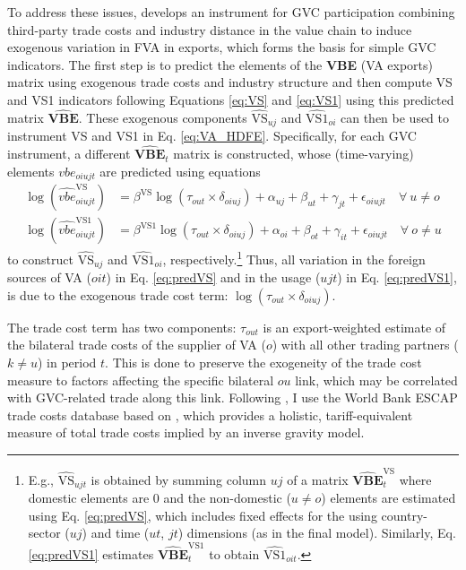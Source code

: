 \documentclass[a4paper]{article}
\begin{document}
To address these issues, \citet{Kummritz20161} develops an instrument for GVC participation combining third-party trade costs and industry distance in the value chain to induce exogenous variation in FVA in exports, which forms the basis for simple GVC indicators. The first step is to predict the elements of the \textbf{VBE} (VA exports) matrix using exogenous trade costs and industry structure and then compute VS and VS1 indicators following Equations \ref{eq:VS} and \ref{eq:VS1} using this predicted matrix $\hat{\textbf{VBE}}$. These exogenous components $\hat{\text{VS}}_{uj}$ and $\hat{\text{VS1}}_{oi}$ can then be used to instrument VS and VS1 in Eq. \ref{eq:VA_HDFE}. Specifically, for each GVC instrument, a different $\hat{\textbf{VBE}}_t$ matrix is constructed, whose (time-varying) elements $vbe_{oiujt}$ are predicted using equations
%
\begin{align} \label{eq:predVS}
\log(\hat{vbe}_{oiujt}^\text{VS}) &= \beta^\text{VS} \log(\tau_{out}\times \delta_{oiuj}) + \alpha_{uj} + \beta_{ut} +\gamma_{jt} + \epsilon_{oiujt} \quad \forall\  u\neq o \\ \label{eq:predVS1}
\log(\hat{vbe}_{oiujt}^\text{VS1}) &= \beta^\text{VS1} \log(\tau_{out}\times \delta_{oiuj}) + \alpha_{oi} + \beta_{ot} +\gamma_{it} + \epsilon_{oiujt} \quad \forall\  o\neq u
\end{align}
%
to construct $\hat{\text{VS}}_{uj}$ and $\hat{\text{VS1}}_{oi}$, respectively.\footnote{E.g., $\hat{\text{VS}}_{ujt}$ is obtained by summing column $uj$ of a matrix $\hat{\textbf{VBE}}_t^\text{VS}$ where domestic elements are 0 and the non-domestic ($u\neq o$) elements are estimated using Eq. \ref{eq:predVS}, which includes fixed effects for the using country-sector ($uj$) and time ($ut$, $jt$) dimensions (as in the final model). Similarly, Eq. \ref{eq:predVS1} estimates $\hat{\textbf{VBE}}_t^\text{VS1}$ to obtain $\hat{\text{VS1}}_{oit}$. \vspace{-5mm} } Thus, all variation in the foreign sources of VA ($oit$) in Eq. \ref{eq:predVS} and in the usage ($ujt$) in Eq. \ref{eq:predVS1}, is due to the exogenous trade cost term: $\log(\tau_{out}\times \delta_{oiuj})$. \newline

The trade cost term has two components: $\tau_{out}$ is an export-weighted estimate of the bilateral trade costs of the supplier of VA ($o$) with all other trading partners ($k\neq u$) in period $t$. This is done to preserve the exogeneity of the trade cost measure to factors affecting the specific bilateral $ou$ link, which may be correlated with GVC-related trade along this link. Following \citet{Kummritz20161}, I use the World Bank ESCAP trade costs database \citep{arvis2016trade} based on \citet{novy2013gravity}, which provides a holistic, tariff-equivalent measure of total trade costs implied by an inverse gravity model. \newline 
\end{document}
